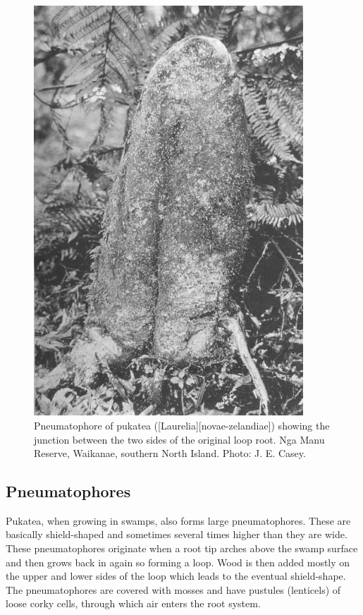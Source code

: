 \begin{figure}[htb]
\begin{minipage}[t]{0.44\textwidth}
    	\includegraphics[width=0.9\textwidth]{graphics/figure11pukatea.jpg}
    	\caption[Pneumatophore of pukatea showing the junction between the two sides of the original loop root]{Pneumatophore of pukatea ([Laurelia][novae-zelandiae]) showing the junction between the two sides of the original loop root.
    	Nga Manu Reserve, Waikanae, southern North Island.
    	Photo:  J. E. Casey.}%
    	\label{fig:11pukatea}
	\end{minipage}
\end{figure}

\subsection{Pneumatophores}

Pukatea, when growing in swamps, also forms large pneumatophores.
These are basically shield-shaped and sometimes several times higher than they are wide.
These pneumatophores originate when a root tip arches above the swamp surface and then grows back in again so forming a loop.
Wood is then added mostly on the upper and lower sides of the loop which leads to the eventual shield-shape.
The pneumatophores are covered with mosses and have pustules (lenticels) of loose corky cells, through which air enters the root system.

